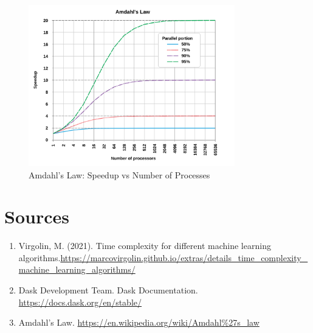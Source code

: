 \documentclass[11pt,a4paper]{article}
\begin{document}
\begin{figure}[H]
    \centering
    \includegraphics[width=0.8\textwidth]{amdahl.png}
    \caption{Amdahl's Law: Speedup vs Number of Processes}
\end{figure}

\section{Sources}
\begin{enumerate}
    \item Virgolin, M. (2021). Time complexity for different machine learning algorithms.\url{https://marcovirgolin.github.io/extras/details_time_complexity_machine_learning_algorithms/}
    \item Dask Development Team. Dask Documentation.  \url{https://docs.dask.org/en/stable/}
    \item Amdahl's Law. \url{https://en.wikipedia.org/wiki/Amdahl%27s_law}
\end{enumerate}
\end{document}
